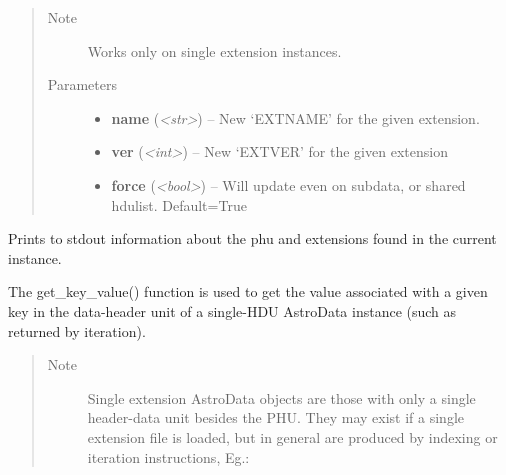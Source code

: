 \documentclass[letterpaper,10pt,english]{sphinxmanual}
\begin{document}
\begin{fulllineitems}
\begin{fulllineitems}
\begin{quote}
\begin{description}
\item[{Note }] \leavevmode
Works only on single extension instances.

\item[{Parameters}] \leavevmode\begin{itemize}
\item {} 
\textbf{name} (\emph{\textless{}str\textgreater{}}) -- New `EXTNAME' for the given extension.

\item {} 
\textbf{ver} (\emph{\textless{}int\textgreater{}}) -- New `EXTVER' for the given extension

\item {} 
\textbf{force} (\emph{\textless{}bool\textgreater{}}) -- Will update even on subdata, or shared hdulist.
Default=True

\end{itemize}

\end{description}\end{quote}

\end{fulllineitems}


\begin{fulllineitems}
\label{astro_class:astrodata.AstroData.AstroData.info}
Prints to stdout information about the phu and extensions found 
in the current instance.

\end{fulllineitems}


\begin{fulllineitems}
\label{astro_class:astrodata.AstroData.AstroData.get_key_value}
The get\_key\_value() function is used to get the value associated
with a given key in the data-header unit of a single-HDU
AstroData instance (such as returned by iteration).
\begin{quote}\begin{description}
\item[{Note }] \leavevmode
Single extension AstroData objects are those with only a single
header-data unit besides the PHU.  They may exist if a single
extension file is loaded, but in general are produced by indexing or
iteration instructions, Eg.:
\begin{quote}


\end{quote}
\end{description}
\end{quote}
\end{fulllineitems}
\end{fulllineitems}
\end{document}
